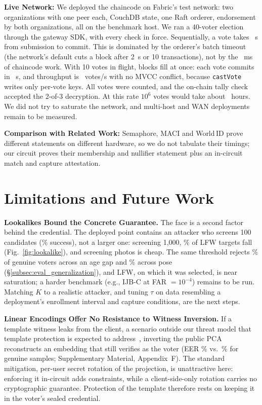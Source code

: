\documentclass[10pt,letterpaper,journal]{IEEEtran}
\begin{document}
\textbf{Live Network:} We deployed the chaincode on Fabric's test network: two organizations with one peer each, CouchDB state, one Raft orderer, endorsement by both organizations, all on the benchmark host. We ran a 40-voter election through the gateway SDK, with every check in force. Sequentially, a vote takes \nFabSeqS~s from submission to commit. This is dominated by the orderer's batch timeout (the network's default cuts a block after 2~s or 10 transactions), not by the \nCastVoteMs~ms of chaincode work. With 10 votes in flight, blocks fill at once: each vote commits in \nFabConcS~s, and throughput is \nFabTps~votes/s with no MVCC conflict, because \texttt{castVote} writes only per-vote keys. All \nFabVoters{} votes were counted, and the on-chain tally check accepted the 2-of-3 decryption. At this rate $10^6$ votes would take about \nFabMillionH~hours. We did not try to saturate the network, and multi-host and WAN deployments remain to be measured.

\textbf{Comparison with Related Work:} Semaphore, MACI and World\,ID prove different statements on different hardware, so we do not tabulate their timings; our circuit proves their membership and nullifier statement plus an in-circuit match and capture attestation.


\section{Limitations and Future Work}
\label{sec:limitations}

\textbf{Lookalikes Bound the Concrete Guarantee.} The face is a second factor behind the credential. The deployed point contains an attacker who screens 100 candidates (\nLookLfwHundred\% success), not a larger one: screening 1,000, \nLookLfwThousand\% of LFW targets fall (Fig.~\ref{fig:lookalike}), and screening photos is cheap. The same threshold rejects \nCalfwFrr\% of genuine voters across an age gap and \nCplfwFrr\% across pose (\S\ref{subsec:eval_generalization}), and LFW, on which it was selected, is near saturation; a harder benchmark (e.g., IJB-C at FAR $= 10^{-4}$) remains to be run. Matching $K$ to a realistic attacker, and tuning $\tau$ on data resembling a deployment's enrollment interval and capture conditions, are the next steps.

\textbf{Linear Encodings Offer No Resistance to Witness Inversion.} If a template witness leaks from the client, a scenario outside our threat model that template protection is expected to address~\cite{ISO24745}, inverting the public PCA reconstructs an embedding that still verifies as the voter (EER \nInvEer\% vs.\ \nInvRawEer\% for genuine samples; Supplementary Material, Appendix~F). The standard mitigation, per-user secret rotation of the projection, is unattractive here: enforcing it in-circuit adds constraints, while a client-side-only rotation carries no cryptographic guarantee. Protection of the template therefore rests on keeping it in the voter's sealed credential.
\end{document}
